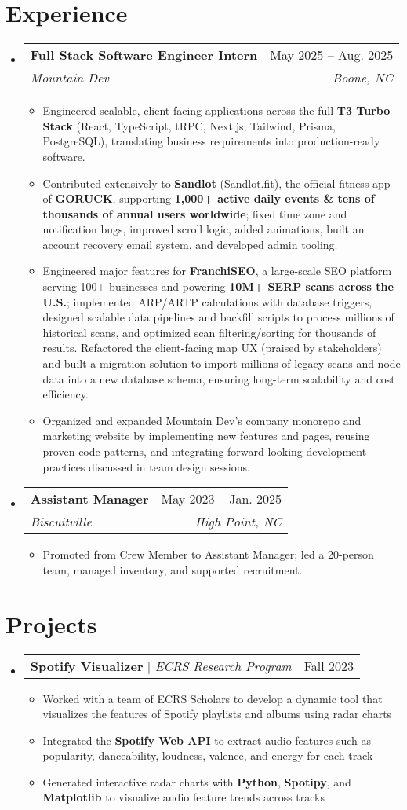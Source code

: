 \documentclass[letterpaper,11pt]{article}
\makeatletter
\newcommand{\resumeItem}[1]{
  \item\small{
    {#1 \vspace{-2pt}}
  }
}
\newcommand{\resumeSubheading}[4]{
  \vspace{-2pt}\item
    \begin{tabular*}{0.97\textwidth}[t]{l@{\extracolsep{\fill}}r}
      \textbf{#1} & #2 \\
      \textit{\small#3} & \textit{\small #4} \\
    \end{tabular*}\vspace{-7pt}
}
\newcommand{\resumeProjectHeading}[2]{
    \item
    \begin{tabular*}{0.97\textwidth}{l@{\extracolsep{\fill}}r}
      \small#1 & #2 \\
    \end{tabular*}\vspace{-7pt}
}
\newcommand{\resumeSubHeadingListStart}{\begin{itemize}[leftmargin=0.15in, label={}]}
\newcommand{\resumeSubHeadingListEnd}{\end{itemize}}
\newcommand{\resumeItemListStart}{\begin{itemize}}
\newcommand{\resumeItemListEnd}{\end{itemize}\vspace{-5pt}}
\makeatother
\begin{document}
\section{Experience}
  \resumeSubHeadingListStart

    \resumeSubheading
  {\textbf{Full Stack Software Engineer Intern}}{May 2025 -- Aug. 2025}
  {Mountain Dev}{Boone, NC}
  \resumeItemListStart
    \resumeItem{Engineered scalable, client-facing applications across the full \textbf{T3 Turbo Stack} (React, TypeScript, tRPC, Next.js, Tailwind, Prisma, PostgreSQL), translating business requirements into production-ready software.}
    \resumeItem{Contributed extensively to \textbf{Sandlot} (Sandlot.fit), the official fitness app of \textbf{GORUCK}, supporting \textbf{1,000+ active daily events \& tens of thousands of annual users worldwide}; fixed time zone and notification bugs, improved scroll logic, added animations, built an account recovery email system, and developed admin tooling.}
    \resumeItem{Engineered major features for \textbf{FranchiSEO}, a large-scale SEO platform serving 100+ businesses and powering \textbf{10M+ SERP scans across the U.S.}; implemented ARP/ARTP calculations with database triggers, designed scalable data pipelines and backfill scripts to process millions of historical scans, and optimized scan filtering/sorting for thousands of results. Refactored the client-facing map UX (praised by stakeholders) and built a migration solution to import millions of legacy scans and node data into a new database schema, ensuring long-term scalability and cost efficiency.}
    \resumeItem{Organized and expanded Mountain Dev’s company monorepo and marketing website by implementing new features and pages, reusing proven code patterns, and integrating forward-looking development practices discussed in team design sessions.}
  \resumeItemListEnd

    \resumeSubheading
      {\textbf{Assistant Manager}}{May 2023 -- Jan. 2025}
      {Biscuitville}{High Point, NC}
      \resumeItemListStart
        \resumeItem{Promoted from Crew Member to Assistant Manager; led a 20-person team, managed inventory, and supported recruitment.}
      \resumeItemListEnd

  \resumeSubHeadingListEnd

\section{Projects}
  \resumeSubHeadingListStart         

    \resumeProjectHeading
      {\textbf{Spotify Visualizer} $|$ \emph{ECRS Research Program}}{Fall 2023}
      \resumeItemListStart
        \resumeItem{Worked with a team of ECRS Scholars to develop a dynamic tool that visualizes the features of Spotify playlists and albums using radar charts}
        \resumeItem{Integrated the \textbf{Spotify Web API} to extract audio features such as popularity, danceability, loudness, valence, and energy for each track}
        \resumeItem{Generated interactive radar charts with \textbf{Python}, \textbf{Spotipy}, and \textbf{Matplotlib} to visualize audio feature trends across tracks}
      \resumeItemListEnd

  \resumeSubHeadingListEnd
\end{document}
